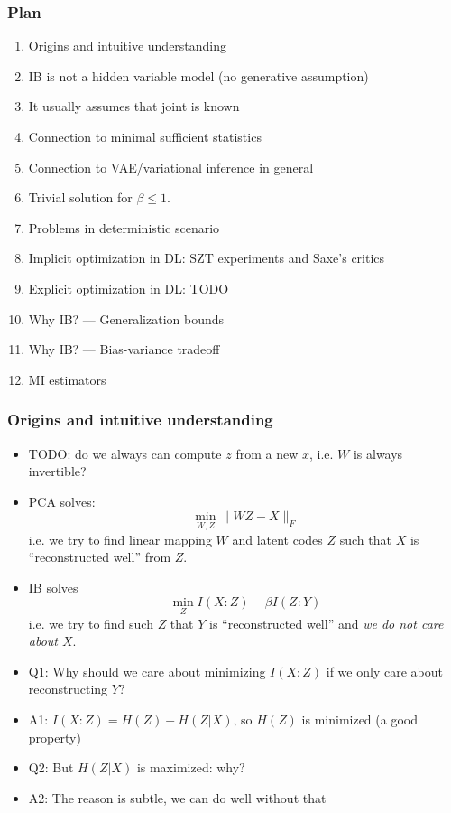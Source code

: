 \documentclass[10pt]{beamer}
\begin{document}
\begin{frame}
\frametitle{Plan}

\begin{enumerate}
    \item Origins and intuitive understanding
    \item IB is not a hidden variable model (no generative assumption)
    \item It usually assumes that joint is known
    \item Connection to minimal sufficient statistics
    \item Connection to VAE/variational inference in general
    \item Trivial solution for $\beta \leq 1$.
    \item Problems in deterministic scenario
    \item Implicit optimization in DL: SZT experiments and Saxe's critics
    \item Explicit optimization in DL: TODO
    \item Why IB? --- Generalization bounds
    \item Why IB? --- Bias-variance tradeoff
    \item MI estimators
\end{enumerate}
\end{frame}

\begin{frame}
\frametitle{Origins and intuitive understanding}
\begin{itemize}
    \item TODO: do we always can compute $z$ from a new $x$, i.e. $W$ is always invertible?
    \item PCA solves:
\begin{equation*}
\min_{W,Z} \| WZ - X\|_F
\end{equation*}
i.e. we try to find linear mapping $W$ and latent codes $Z$ such that $X$ is ``reconstructed well'' from $Z$.
\item IB solves
\begin{equation*}
\min_{Z} I(X:Z) - \beta I(Z:Y)
\end{equation*}
i.e. we try to find such $Z$ that $Y$ is ``reconstructed well'' and \textit{we do not care about $X$}.
\item Q1: Why should we care about minimizing $I(X:Z)$ if we only care about reconstructing $Y$?
\item A1: $I(X:Z) = H(Z) - H(Z|X)$, so $H(Z)$ is minimized (a good property)
\item Q2: But $H(Z|X)$ is maximized: why?
\item A2: The reason is subtle, we can do well without that
\end{itemize}
\end{frame}
\end{document}
